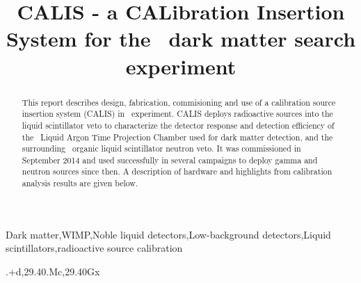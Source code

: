 \documentclass[preprint,12pt]{elsarticle}
\begin{document}
\begin{frontmatter}
\title{CALIS - a CALibration Insertion System for the \dsf\, dark matter search experiment}
%


\begin{abstract}
This report describes design, fabrication, commisioning and use of  a calibration source insertion system (CALIS) in \dsf\ experiment. CALIS  deploys radioactive sources into the liquid scintillator veto to characterize the detector response and detection efficiency of the \dsf\ Liquid Argon Time Projection Chamber used for dark matter detection, and the surrounding \lsvscintillatormass\ organic liquid scintillator neutron veto.
It was commissioned in September 2014 and used successfully in several campaigns to deploy gamma and neutron sources since then. A description of hardware and highlights from calibration analysis results are given below.


\end{abstract}
\begin{keyword}


Dark matter\sep WIMP\sep Noble liquid detectors\sep Low-background detectors\sep Liquid scintillators\sep radioactive source calibration

.+d\sep 29.40.Mc\sep 29.40Gx

\end{keyword}

\end{frontmatter}
\end{document}
